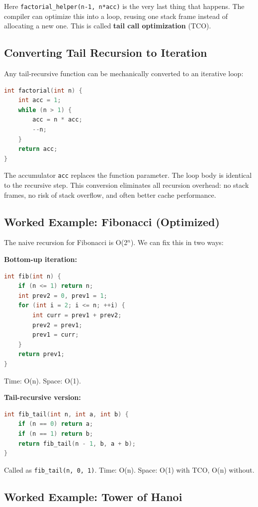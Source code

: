 Here \texttt{factorial\_helper(n-1, n*acc)} is the very last thing that happens. The compiler can optimize this into a loop, reusing one stack frame instead of allocating a new one. This is called \textbf{tail call optimization} (TCO).

\subsection{Converting Tail Recursion to Iteration}

Any tail-recursive function can be mechanically converted to an iterative loop:

\begin{lstlisting}[language=C++]
int factorial(int n) {
    int acc = 1;
    while (n > 1) {
        acc = n * acc;
        --n;
    }
    return acc;
}
\end{lstlisting}

The accumulator \texttt{acc} replaces the function parameter. The loop body is identical to the recursive step. This conversion eliminates all recursion overhead: no stack frames, no risk of stack overflow, and often better cache performance.

\subsection{Worked Example: Fibonacci (Optimized)}

The naive recursion for Fibonacci is O(2$^{n}$). We can fix this in two ways:

\textbf{Bottom-up iteration:}
\begin{lstlisting}[language=C++]
int fib(int n) {
    if (n <= 1) return n;
    int prev2 = 0, prev1 = 1;
    for (int i = 2; i <= n; ++i) {
        int curr = prev1 + prev2;
        prev2 = prev1;
        prev1 = curr;
    }
    return prev1;
}
\end{lstlisting}

Time: O(n). Space: O(1).

\textbf{Tail-recursive version:}
\begin{lstlisting}[language=C++]
int fib_tail(int n, int a, int b) {
    if (n == 0) return a;
    if (n == 1) return b;
    return fib_tail(n - 1, b, a + b);
}
\end{lstlisting}

Called as \texttt{fib\_tail(n, 0, 1)}. Time: O(n). Space: O(1) with TCO, O(n) without.

\subsection{Worked Example: Tower of Hanoi}

